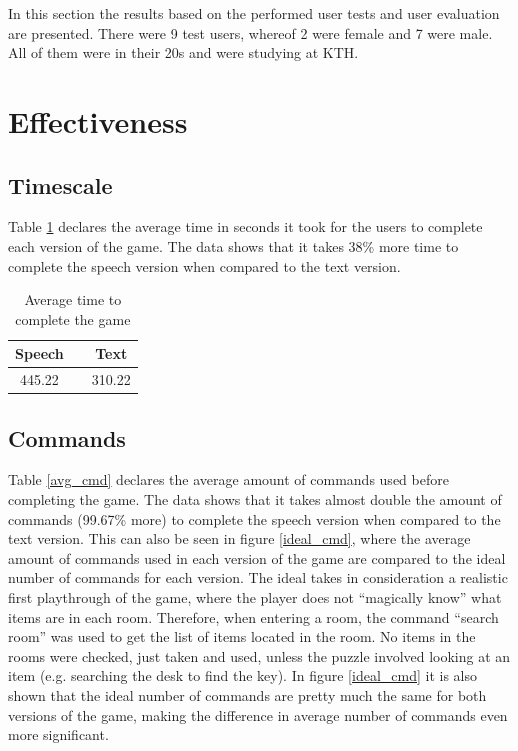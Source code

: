 In this section the results based on the performed user tests and user evaluation are presented. There were 9 test users, whereof 2 were female and 7 were male. All of them were in their 20s and were studying at KTH.

\section{Effectiveness}

\subsection{Timescale} %
Table \ref{avg_time} declares the average time in seconds it took for the users to complete each version of the game. The data shows that it takes 38\% more time to complete the speech version when compared to the text version.

\begin{table}[ht]
  \centering
  \begin{tabular}{ccc}
    \toprule
    Speech &   & Text\\
    \midrule
    445.22 &   & 310.22\\
    \bottomrule
  \end{tabular}
  \caption{Average time to complete the game}\label{avg_time}
\end{table}

\subsection{Commands} %
Table \ref{avg_cmd} declares the average amount of commands used before completing the game. The data shows that it takes almost double the amount of commands (99.67\% more) to complete the speech version when compared to the text version. This can also be seen in figure \ref{ideal_cmd}, where the average amount of commands used in each version of the game are compared to the ideal number of commands for each version. The ideal takes in consideration a realistic first playthrough of the game, where the player does not ``magically know'' what items are in each room. Therefore, when entering a room, the command “search room” was used to get the list of items located in the room. No items in the rooms were checked, just taken and used, unless the puzzle involved looking at an item (e.g. searching the desk to find the key). In figure \ref{ideal_cmd} it is also shown that the ideal number of commands are pretty much the same for both versions of the game, making the difference in average number of commands even more significant.


